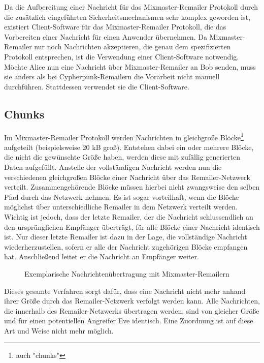 Da die Aufbereitung einer Nachricht für das Mixmaster-Remailer Protokoll durch die zusätzlich eingeführten Sicherheitsmechanismen sehr komplex geworden ist, existiert Client-Software für das Mixmaster-Remailer Protokoll, die das Vorbereiten einer Nachricht für einen Anwender übernehmen. Da Mixmaster-Remailer nur noch Nachrichten akzeptieren, die genau dem spezifizierten Protokoll entsprechen, ist die Verwendung einer Client-Software notwendig. Möchte Alice nun eine Nachricht über Mixmaster-Remailer an Bob senden, muss sie anders als bei Cypherpunk-Remailern die Vorarbeit nicht manuell durchführen. Stattdessen verwendet sie die Client-Software.

\subsection{Chunks}
Im Mixmaster-Remailer Protokoll werden Nachrichten in gleichgroße Blöcke\footnote{auch "chunks"} aufgeteilt (beispielsweise 20 kB groß). Entstehen dabei ein oder mehrere Blöcke, die nicht die gewünschte Größe haben, werden diese mit zufällig generierten Daten aufgefüllt. Anstelle der vollständigen Nachricht werden nun die verschiedenen gleichgroßen Blöcke einer Nachricht über das Remailer-Netzwerk verteilt. Zusammengehörende Blöcke müssen hierbei nicht zwangsweise den selben Pfad durch das Netzwerk nehmen. Es ist sogar vorteilhaft, wenn die Blöcke möglichst über unterschiedliche Remailer in dem Netzwerk verteilt werden. Wichtig ist jedoch, dass der letzte Remailer, der die Nachricht schlussendlich an den ursprünglichen Empfänger überträgt, für alle Blöcke einer Nachricht identisch ist. Nur dieser letzte Remailer ist dazu in der Lage, die vollständige Nachricht wiederherzustellen, sofern er alle der Nachricht zugehörigen Blöcke empfangen hat. Anschließend leitet er die Nachricht an Empfänger weiter.

\begin{figure}
	\begin{center}
		\def\svgwidth{0.9 \linewidth}
		
		\caption{Exemplarische Nachrichtenübertragung mit Mixmaster-Remailern}
	\end{center}
\end{figure}

Dieses gesamte Verfahren sorgt dafür, dass eine Nachricht nicht mehr anhand ihrer Größe durch das Remailer-Netzwerk verfolgt werden kann. Alle Nachrichten, die innerhalb des Remailer-Netzwerks übertragen werden, sind von gleicher Größe und für einen potentiellen Angreifer Eve identisch. Eine Zuordnung ist auf diese Art und Weise nicht mehr möglich.

